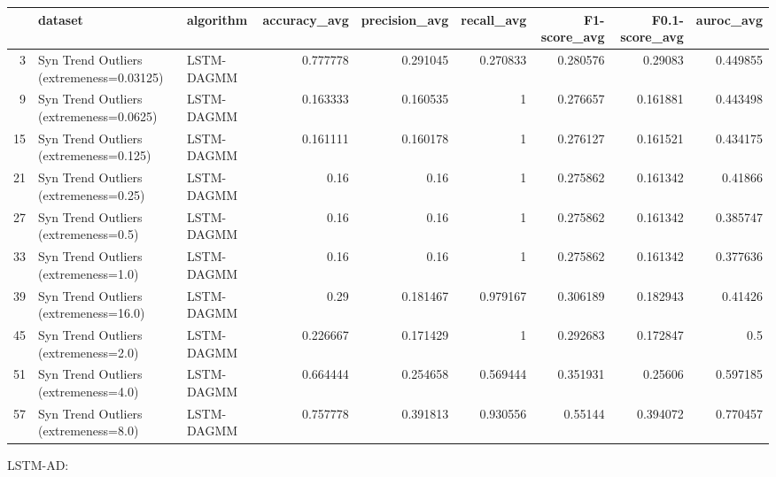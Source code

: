 \begin{tabular}{rllrrrrrr}
\hline
    & dataset                                  & algorithm   &   accuracy\_avg &   precision\_avg &   recall\_avg &   F1-score\_avg &   F0.1-score\_avg &   auroc\_avg \\
\hline
  3 & Syn Trend Outliers (extremeness=0.03125) & LSTM-DAGMM  &       0.777778 &        0.291045 &     0.270833 &       0.280576 &         0.29083  &    0.449855 \\
  9 & Syn Trend Outliers (extremeness=0.0625)  & LSTM-DAGMM  &       0.163333 &        0.160535 &     1        &       0.276657 &         0.161881 &    0.443498 \\
 15 & Syn Trend Outliers (extremeness=0.125)   & LSTM-DAGMM  &       0.161111 &        0.160178 &     1        &       0.276127 &         0.161521 &    0.434175 \\
 21 & Syn Trend Outliers (extremeness=0.25)    & LSTM-DAGMM  &       0.16     &        0.16     &     1        &       0.275862 &         0.161342 &    0.41866  \\
 27 & Syn Trend Outliers (extremeness=0.5)     & LSTM-DAGMM  &       0.16     &        0.16     &     1        &       0.275862 &         0.161342 &    0.385747 \\
 33 & Syn Trend Outliers (extremeness=1.0)     & LSTM-DAGMM  &       0.16     &        0.16     &     1        &       0.275862 &         0.161342 &    0.377636 \\
 39 & Syn Trend Outliers (extremeness=16.0)    & LSTM-DAGMM  &       0.29     &        0.181467 &     0.979167 &       0.306189 &         0.182943 &    0.41426  \\
 45 & Syn Trend Outliers (extremeness=2.0)     & LSTM-DAGMM  &       0.226667 &        0.171429 &     1        &       0.292683 &         0.172847 &    0.5      \\
 51 & Syn Trend Outliers (extremeness=4.0)     & LSTM-DAGMM  &       0.664444 &        0.254658 &     0.569444 &       0.351931 &         0.25606  &    0.597185 \\
 57 & Syn Trend Outliers (extremeness=8.0)     & LSTM-DAGMM  &       0.757778 &        0.391813 &     0.930556 &       0.55144  &         0.394072 &    0.770457 \\
\hline
\end{tabular}

LSTM-AD:

